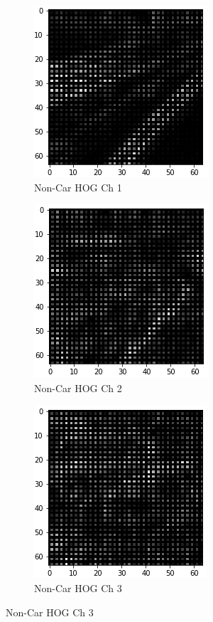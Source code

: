 \documentclass[12pt]{article}
\begin{document}
\begin{figure}[!h]
\begin{subfigure}{0.32\textwidth}
\end{subfigure}
\begin{subfigure}{0.32\textwidth}
\centering
\includegraphics[scale=0.5]{non_car_hog_ch1.png}
\caption{Non-Car HOG Ch 1}
\end{subfigure}
\begin{subfigure}{0.32\textwidth}
\centering
\includegraphics[scale=0.5]{non_car_hog_ch2.png}
\caption{Non-Car HOG Ch 2}
\end{subfigure}
\begin{subfigure}{0.32\textwidth}
\centering
\includegraphics[scale=0.5]{non_car_hog_ch3.png}
\caption{Non-Car HOG Ch 3}
\end{subfigure}
\end{figure}
\end{document}
